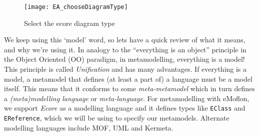 \pagebreak

\begin{figure}[htbp]
	\centering
  \texttt{[image: EA\_chooseDiagramType]}
	\caption{Select the ecore diagram type}
	\label{fig:diagram_type}
\end{figure}
\FloatBarrier
We keep using this `model' word, so lets have a quick review of what it means, and why we're using it. In analogy to the ``everything is an object'' principle in the Object Oriented (OO) paradigm, in metamodelling, everything is a model!  This principle is called \emph{Unification} and has many advantages. If everything is a model, a metamodel that defines (at least a part of) a language must be a model itself.
This means that it conforms to some \emph{meta-metamodel} which in turn defines a \emph{(meta)modelling language} or \emph{meta-language}.
For metamodelling with eMoflon, we support \emph{Ecore} as a modelling language and it defines types like \texttt{EClass} and \texttt{EReference}, which we will be using to specify  our metamodels.
Alternate modelling languages include MOF, UML and Kermeta.

